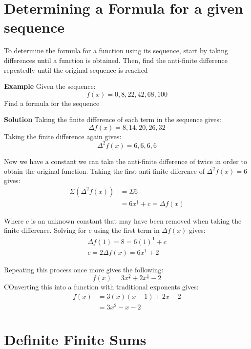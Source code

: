\documentclass{article}
\begin{document}
\section{Determining a Formula for a given sequence}
To determine the formula for a function using its sequence, start by taking differences until a function is obtained. Then, find the anti-finite difference repeatedly until the original sequence is reached

\textbf{Example}
Given the sequence: \[f(x) = 0,8,22,42,68,100\]
Find a formula for the sequence

\textbf{Solution}
Taking the finite difference of each term in the sequence gives:
\[\Delta f(x) = 8, 14, 20, 26, 32\]
Taking the finite difference again gives:
\[\Delta^2 f(x) = 6, 6, 6, 6\]

Now we have a constant we can take the anti-finite difference of twice in order to obtain the original function. Taking the first anti-finite diference of \(\Delta^2 f(x) = 6\) gives:
\begin{align*}
    \Sigma(\Delta^2 f(x)) & = \Sigma 6 \\
    & = 6x^{\underline{1}} + c = \Delta f(x)
\end{align*}

Where \(c\) is an unknown constant that may have been removed when taking the finite difference. Solving for \(c\) using the first term in \(\Delta f(x)\) gives:
\begin{align*}
    \Delta f(1) = 8 = 6(1)^{\underline{1}} + c \\
    c = 2
    \Delta f(x) = 6x^{\underline{1}} + 2
\end{align*}

Repeating this process once more gives the following: \[f(x) = 3x^{\underline{2}} + 2x^{\underline{1}} - 2\]
COnverting this into a function with traditional exponents gives: 
\begin{align*}
    f(x) & = 3(x)(x-1) + 2x - 2 \\
    & = 3x^2 - x - 2
\end{align*}

\section{Definite Finite Sums}
\end{document}
